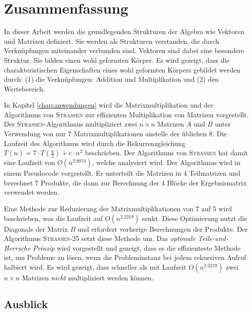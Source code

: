 \documentclass[oneside]{scrbook}
\numberwithin{equation}{section}
\begin{document}
\chapter{Zusammenfassung}
In dieser Arbeit werden die grundlegenden Strukturen der Algebra wie Vektoren und Matrizen definiert. Sie werden als Strukturen verstanden, die durch Verknüpfungen miteinander verbunden sind. Vektoren sind dabei eine besondere Struktur. Sie bilden einen wohl geformten Körper. Es wird gezeigt, dass die charakteristischen Eigenschaften eines wohl geformten Körpers gebildet werden durch: (1) die Verknüpfungen: Addition und Multiplikation und (2) den Wertebereich.

In Kapitel \ref{chap:anwendungen} wird die Matrixmultiplikation und der Algorithmus von \textsc{Strassen} zur effizienten Multiplikation von Matrizen vorgestellt. Der \textsc{Strassen}-Algorithmus multipliziert zwei $n \times n$ Matrizen $A$ und $B$ unter Verwendung von nur 7 Matrixmultiplikationen anstelle der üblichen 8. Die Laufzeit des Algorithmus wird durch die Rekurrenzgleichung $T(n) = 7 \cdot T\left(\frac{n}{2}\right) + c \cdot n^2$ beschrieben. Der Algorithmus von \textsc{Strassen} hat damit eine Laufzeit von $O(n^{2.8074})$, welche analysiert wird. Der Algorithmus wird in einem Pseudocode vorgestellt. Er unterteilt die Matrizen in 4 Teilmatrizen und berechnet 7 Produkte, die dann zur Berechnung der 4 Blöcke der Ergebnismatrix verwendet werden.

Eine Methode zur Reduzierung der Matrixmultiplikationen von 7 auf 5 wird beschrieben, was die Laufzeit auf $O(n^{2.3219})$ senkt. Diese Optimierung nutzt die Diagonale der Matrix $B$ und erfordert vorherige Berechnungen der Produkte. Der Algorithmus \textsc{Strassen-25} setzt diese Methode um. Das \textit{optimale Teile-und-Herrsche Prinzip} wird vorgestellt und gezeigt, dass es die effizienteste Methode ist, um Probleme zu lösen, wenn die Probleminstanz bei jedem rekursiven Aufruf halbiert wird. Es wird gezeigt, dass schneller als mit Laufzeit $O(n^{2.3219})$ zwei $n \times n$ Matrizen \textit{nicht} multipliziert werden können.

\section{Ausblick}
\end{document}

